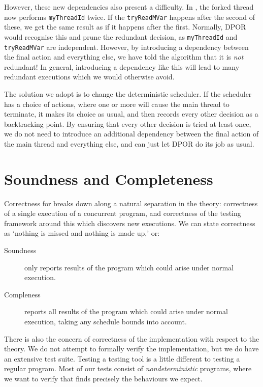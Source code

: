 However, these new dependencies also present a difficulty.  In
, the forked thread now performs \verb|myThreadId|
twice.  If the \verb|tryReadMVar| happens after the second of these,
we get the same result as if it happens after the first.  Normally,
DPOR would recognise this and prune the redundant decision, as
\verb|myThreadId| and \verb|tryReadMVar| are independent.  However, by
introducing a dependency between the final action and everything else,
we have told the algorithm that it is \emph{not} redundant!  In
general, introducing a dependency like this will lead to many
redundant executions which we would otherwise avoid.

The solution we adopt is to change the deterministic scheduler.  If
the scheduler has a choice of actions, where one or more will cause
the main thread to terminate, it makes its choice as usual, and then
records every other decision as a backtracking point.  By ensuring
that every other decision is tried at least once, we do not need to
introduce an additional dependency between the final action of the
main thread and everything else, and can just let DPOR do its job as
usual.

\section{Soundness and Completeness}
\label{sec:dejafu-correctness}

Correctness for \dejafu{} breaks down along a natural separation in
the theory: correctness of a single execution of a concurrent program,
and correctness of the testing framework around this which discovers
new executions.  We can state correctness as `nothing is missed and
nothing is made up,' or:

\begin{description}
\item[Soundness] \dejafu{} only reports results of the program which
  could arise under normal execution.
\item[Compleness] \dejafu{} reports all results of the program which
  could arise under normal execution, taking any schedule bounds into
  account.
\end{description}

There is also the concern of correctness of the implementation with
respect to the theory.  We do not attempt to formally verify the
implementation, but we do have an extensive test suite.  Testing a
testing tool is a little different to testing a regular program.  Most
of our tests consist of \emph{nondeterministic} programs, where we
want to verify that \dejafu{} finds precisely the behaviours we
expect.

